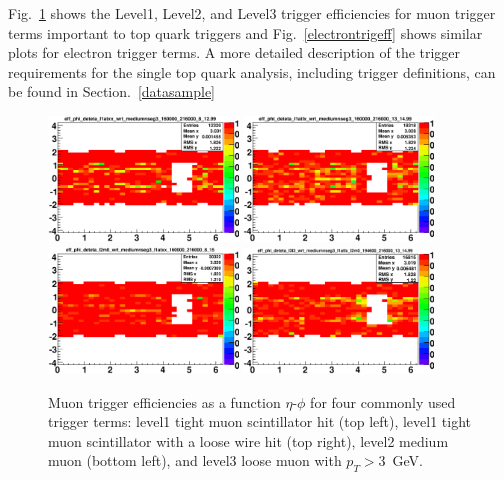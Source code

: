  Fig.~\ref{muontrigeff} shows the Level1, Level2, and Level3 trigger efficiencies for muon trigger terms important to top quark triggers and Fig.~\ref{electrontrigeff} shows similar plots for electron trigger terms. A more detailed description of the trigger requirements for the single top quark analysis, including trigger definitions, can be found in Section.~\ref{datasample}


\begin{figure}[!h!tbp]
\begin{center}
\includegraphics[width=0.45\textwidth]{eps/Reco/l1atxx.eps}
\includegraphics[width=0.45\textwidth]{eps/Reco/l1atlx.eps}
\includegraphics[width=0.45\textwidth]{eps/Reco/l2m0.eps}
\includegraphics[width=0.45\textwidth]{eps/Reco/l3l3.eps}
\end{center}
\vspace{-0.1in}
\caption[muontrigeff]{Muon trigger efficiencies as a function $\eta$-$\phi$ for four commonly used trigger terms: level1 tight muon scintillator hit (top left), level1 tight muon scintillator with a loose wire hit (top right), level2 medium muon (bottom left), and level3 loose muon with $p_{T}>3$~GeV.}
\label{muontrigeff}
\end{figure}


